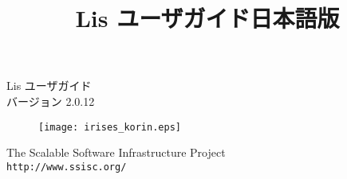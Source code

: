 \documentclass[a4paper]{jarticle}
\title{Lis ユーザガイド日本語版}
\author{}
\date{}
\begin{document}
\vspace*{4cm}
\begin{flushleft}
{\Large Lis ユーザガイド}\\
バージョン 2.0.12
\end{flushleft}

\vspace*{2cm}
\begin{figure}[h]
\texttt{[image: irises\_korin.eps]}
\end{figure}

\vspace*{2cm}
\begin{flushleft}
{\large The Scalable Software Infrastructure
Project\\
{\tt http://www.ssisc.org/}}\\
\end{flushleft}

\vspace*{5mm}
\thispagestyle{empty}
\end{document}
